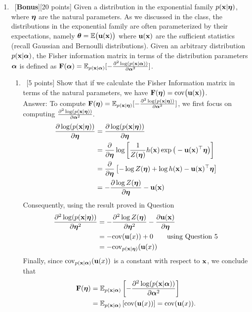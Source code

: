 \documentclass[12pt, fullpage,letterpaper]{article}
\def\red{\color{red}}
\def\blackblue{\color{black!40!blue}}
\begin{document}
\begin{enumerate}
\item~[\textbf{Bonus}][20 points] Given a distribution in the exponential family $p({\bf x}|\boldsymbol{\eta})$, where $\boldsymbol{\eta}$ are the natural parameters. As we discussed in the class, the distributions in the exponential family are often parameterized by their expectations, namely $\boldsymbol{\theta} = \mathbb{E}\big({\bf u}({\bf x})\big)$ where ${\bf u}({\bf x})$ are the sufficient statistics (recall Gaussian and Bernoulli distributions). Given an arbitrary distribution $p({\bf x}|\boldsymbol{\alpha})$, the Fisher information matrix in terms of the distribution parameters $\boldsymbol{\alpha}$ is defined as ${\bf F}(\boldsymbol{\alpha}) = \mathbb{E}_{p({\bf x}|\boldsymbol{\alpha})}[- \frac{\partial^2 \log(p({\bf x}|\boldsymbol{\alpha})) }{\partial \boldsymbol{\alpha}^2}]$. 
\begin{enumerate}
	\item~[5 points] Show that if we calculate the Fisher Information matrix in terms of the natural parameters, we have ${\bf F}(\boldsymbol{\eta}) = \mathrm{cov}\big({\bf u}({\bf x})\big)$.\\
	{\red Answer: }{\blackblue 
	To compute 
	${\bf F}(\boldsymbol{\eta}) = \mathbb{E}_{p({\bf x}|\boldsymbol{\eta})}[- \frac{\partial^2 \log(p({\bf x}|\boldsymbol{\eta})) }{\partial \boldsymbol{\alpha}^2}]$, we first focus on computing 
	$\frac{\partial^2 \log(p({\bf x}|\boldsymbol{\eta})) }{\partial \boldsymbol{\alpha}^2}.$
	\begin{align*}
	\frac{\partial \log(p({\bf x}|\boldsymbol{\eta})) }{\partial \boldsymbol{\eta}} 
	& = \frac{\partial \log(p({\bf x}|\boldsymbol{\eta})) }{\partial \boldsymbol{\eta}} \\
	& = \frac{\partial }{\partial \boldsymbol{\eta}} \log\left[\frac{1}{Z(\boldsymbol{\eta})} h({\bf x})\exp\big(-{\bf u}({\bf x})^\top \boldsymbol{\eta}\big)\right]\\
	& = \frac{\partial }{\partial \boldsymbol{\eta}} \left[-\log Z(\boldsymbol{\eta}) + \log h({\bf x}) -{\bf u}({\bf x})^\top \boldsymbol{\eta}\right]\\
	& = -\frac{\partial \log Z(\boldsymbol{\eta})}{\partial \boldsymbol{\eta}}  - {\bf u}({\bf x})
	\end{align*}
	Consequently, using the result proved in Question 
	\begin{align*}
	\frac{\partial^2 \log(p({\bf x}|\boldsymbol{\eta})) }{\partial \boldsymbol{\eta}^2}
	& = - \frac{\partial^2 \log Z(\boldsymbol{\eta})}{\partial \boldsymbol{\eta}^2}  - \frac{\partial{\bf u}({\bf x})}{\partial \boldsymbol{\eta}}\\
	& = -{\rm cov}({\bf u}(x)) + 0 \quad\quad\mbox{using Question 5}\\
	& = -{\rm cov}_{p({\bf x}|\boldsymbol{\eta})}({\bf u}(x))
	\end{align*}
	Finally, since ${\rm cov}_{p({\bf x}|\boldsymbol{\alpha})}({\bf u}(x))$ is a constant with respect to ${\bf x}$, we conclude that 
	\begin{align*}
	{\bf F}(\boldsymbol{\eta}) & = 
	\mathbb{E}_{p({\bf x}|\boldsymbol{\alpha})}\left[- \frac{\partial^2 \log(p({\bf x}|\boldsymbol{\alpha})) }{\partial \boldsymbol{\alpha}^2}\right] \\
	&= \mathbb{E}_{p({\bf x}|\boldsymbol{\alpha})}\left[{\rm cov}({\bf u}(x))\right]
	 = {\rm cov}({\bf u}(x)). 
	\end{align*}
	}
	

\end{enumerate}
\end{enumerate}
\end{document}
